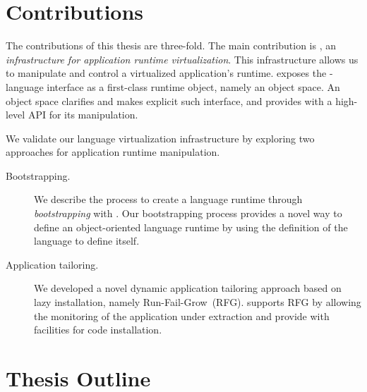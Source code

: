 \section{Contributions}

The contributions of this thesis are three-fold. The main contribution is \Vtt, an \emph{infrastructure for application runtime virtualization}. This infrastructure allows us to manipulate and control a virtualized application's runtime. \Vtt exposes the \VM-language interface as a first-class runtime object, namely an object space. An object space clarifies and makes explicit such interface, and provides with a high-level API for its manipulation.

We validate our language virtualization infrastructure by exploring two approaches for application runtime manipulation.
\begin{description}
\item[Bootstrapping.] We describe the process to create a language runtime through \emph{bootstrapping} with \Vtt. Our bootstrapping process provides a novel way to define an object-oriented language runtime by using the definition of the language to define itself.
\item[Application tailoring.] We developed a novel dynamic application tailoring approach based on lazy installation, namely Run-Fail-Grow~(RFG). \Vtt supports RFG by allowing the monitoring of the application under extraction and provide with facilities for code installation.
\end{description}

\section{Thesis Outline}

\begin{description}
\item[] 

\item[] 
	
\item[] 

\item[] 

\item[] 

\end{description}



